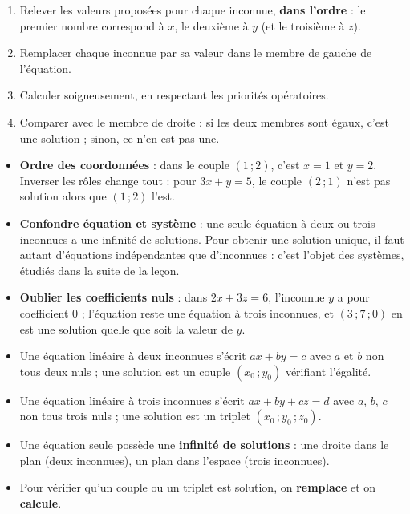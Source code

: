 \documentclass[11pt]{article}
\newcommand{\cle}[1]{{\popxbold\color{popdark}#1}}
\begin{document}
\begin{methode}
\begin{enumerate}
\item Relever les valeurs proposées pour chaque inconnue, \textbf{dans l'ordre} : le premier nombre correspond à $x$, le deuxième à $y$ (et le troisième à $z$).
\item Remplacer chaque inconnue par sa valeur dans le membre de gauche de l'équation.
\item Calculer soigneusement, en respectant les priorités opératoires.
\item Comparer avec le membre de droite : si les deux membres sont égaux, c'est une solution ; sinon, ce n'en est pas une.
\end{enumerate}
\end{methode}

\begin{attention}
\begin{itemize}
\item \textbf{Ordre des coordonnées} : dans le couple $(1 \,; 2)$, c'est $x = 1$ et $y = 2$. Inverser les rôles change tout : pour $3x + y = 5$, le couple $(2 \,; 1)$ n'est pas solution alors que $(1 \,; 2)$ l'est.
\item \textbf{Confondre équation et système} : une seule équation à deux ou trois inconnues a une infinité de solutions. Pour obtenir une solution unique, il faut autant d'équations indépendantes que d'inconnues : c'est l'objet des systèmes, étudiés dans la suite de la leçon.
\item \textbf{Oublier les coefficients nuls} : dans $2x + 3z = 6$, l'inconnue $y$ a pour coefficient $0$ ; l'équation reste une équation à trois inconnues, et $(3 \,; 7 \,; 0)$ en est une solution quelle que soit la valeur de $y$.
\end{itemize}
\end{attention}

\begin{aretenir}
\begin{itemize}
\item Une équation linéaire à deux inconnues s'écrit $ax + by = c$ avec $a$ et $b$ non tous deux nuls ; une solution est un \cle{couple} $(x_0 \,; y_0)$ vérifiant l'égalité.
\item Une équation linéaire à trois inconnues s'écrit $ax + by + cz = d$ avec $a$, $b$, $c$ non tous trois nuls ; une solution est un \cle{triplet} $(x_0 \,; y_0 \,; z_0)$.
\item Une équation seule possède une \textbf{infinité de solutions} : une droite dans le plan (deux inconnues), un plan dans l'espace (trois inconnues).
\item Pour vérifier qu'un couple ou un triplet est solution, on \textbf{remplace} et on \textbf{calcule}.
\end{itemize}
\end{aretenir}
\end{document}

